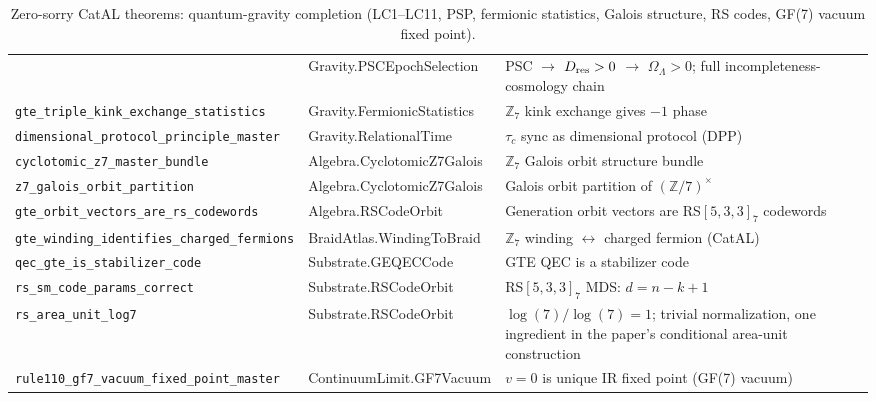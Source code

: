 \documentclass[11pt,a4paper]{article}
\theoremstyle{definition}
\begin{document}
\begin{table}[h]
\begin{tabular}{@{}p{5.2cm}p{4.8cm}p{4.0cm}@{}}
  & Gravity.PSCEpochSelection
  & PSC $\to$ $D_{\rm res}>0$ $\to$ $\Omega_\Lambda>0$; full incompleteness-cosmology chain \\[1pt]
\texttt{gte\_\allowbreak triple\_\allowbreak kink\_\allowbreak exchange\_\allowbreak statistics}
  & Gravity.FermionicStatistics
  & $\mathbb{Z}_7$ kink exchange gives $-1$ phase \\[1pt]
\texttt{dimensional\_\allowbreak protocol\_\allowbreak principle\_\allowbreak master}
  & Gravity.RelationalTime
  & $\tau_c$ sync as dimensional protocol (DPP) \\[1pt]
\texttt{cyclotomic\_\allowbreak z7\_\allowbreak master\_\allowbreak bundle}
  & Algebra.CyclotomicZ7Galois
  & $\mathbb{Z}_7$ Galois orbit structure bundle \\[1pt]
\texttt{z7\_\allowbreak galois\_\allowbreak orbit\_\allowbreak partition}
  & Algebra.CyclotomicZ7Galois
  & Galois orbit partition of $(\mathbb{Z}/7)^\times$ \\[1pt]
\texttt{gte\_\allowbreak orbit\_\allowbreak vectors\_\allowbreak are\_\allowbreak rs\_\allowbreak codewords}
  & Algebra.RSCodeOrbit
  & Generation orbit vectors are RS$[5,3,3]_7$ codewords \\[1pt]
\texttt{gte\_\allowbreak winding\_\allowbreak identifies\_\allowbreak charged\_\allowbreak fermions}
  & BraidAtlas.WindingToBraid
  & $\mathbb{Z}_7$ winding $\leftrightarrow$ charged fermion (CatAL) \\[1pt]
\texttt{qec\_\allowbreak gte\_\allowbreak is\_\allowbreak stabilizer\_\allowbreak code}
  & Substrate.GEQECCode
  & GTE QEC is a stabilizer code \\[1pt]
\texttt{rs\_\allowbreak sm\_\allowbreak code\_\allowbreak params\_\allowbreak correct}
  & Substrate.RSCodeOrbit
  & RS$[5,3,3]_7$ MDS: $d = n - k + 1$ \\[1pt]
\texttt{rs\_\allowbreak area\_\allowbreak unit\_\allowbreak log7}
  & Substrate.RSCodeOrbit
  & $\log(7)/\log(7) = 1$; trivial normalization, one ingredient in the
    paper's conditional area-unit construction \\[1pt]
\texttt{rule110\_\allowbreak gf7\_\allowbreak vacuum\_\allowbreak fixed\_\allowbreak point\_\allowbreak master}
  & ContinuumLimit.GF7Vacuum
  & $v{=}0$ is unique IR fixed point (GF(7) vacuum) \\
\bottomrule
\end{tabular}
\caption{Zero-sorry CatAL theorems: quantum-gravity completion (LC1--LC11, PSP, fermionic statistics, Galois structure, RS codes, GF(7) vacuum fixed point).}
\label{tab:new-theorem-inventory-078}
\end{table}
\end{document}
